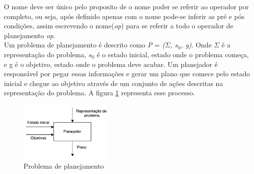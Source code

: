 O nome deve ser único pelo proposito de o nome poder se referir ao operador por completo, ou seja, após definido apenas com o nome pode-se inferir as pré e pós condições, assim escrevendo o nome(\textit{op}) para se referir a todo o operador de planejamento \textit{op}. \\

Um problema de planejamento é descrito como \textit{P} = \textit{($\Sigma$, $s_{0}$, g)}. Onde $\Sigma$ é a representação do problema, $s_{0}$ é o estado inicial, estado onde o problema começa, e g é o objetivo, estado onde o problema deve acabar. Um planejador é responsável por pegar essas informações e gerar um plano que comece pelo estado inicial e chegue ao objetivo através de um conjunto de ações descritas na representação do problema. A figura \ref{fig:planmodelo} representa esse processo.\\

\begin{figure}[ht]
	\centering
	\includegraphics[width=0.4\textwidth]{fig/modelo.pdf}
	\caption{Problema de planejamento}
	\label{fig:planmodelo}
\end{figure} 







